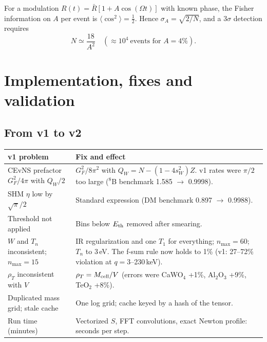 \documentclass[11pt,a4paper]{article}
\numberwithin{equation}{section}
\newcommand{\Eth}{E_{\rm th}}
\newcommand{\avg}[1]{\langle #1\rangle}
\begin{document}
For a modulation $R(t)=\bar R[1+A\cos(\Omega t)]$ with known phase, the Fisher information on
$A$ per event is $\avg{\cos^2}=\frac12$. Hence $\sigma_A=\sqrt{2/N}$, and a $3\sigma$
detection requires
\begin{equation}
  N\simeq\frac{18}{A^2}\quad(\approx10^4\ \text{events for }A=4\%).
\end{equation}

\section{Implementation, fixes and validation}
\label{sec:fixes}\label{sec:validation}
\subsection{From v1 to v2}
\begin{center}\small
\begin{tabularx}{\textwidth}{>{\raggedright}p{4.3cm}X}
\toprule
v1 problem & Fix and effect\\
\midrule
CEvNS prefactor $G_F^2/4\pi$ with $Q_W/2$ & $G_F^2/8\pi^2$ with $Q_W=N-(1-4s_W^2)Z$. v1 rates were $\pi/2$ too large ($^8$B benchmark 1.585 $\to$ 0.9998).\\
SHM $\eta$ low by $\sqrt\pi/2$ & Standard expression (DM benchmark 0.897 $\to$ 0.9988).\\
Threshold not applied & Bins below $\Eth$ removed after smearing.\\
$W$ and $T_n$ inconsistent; $n_{\max}=15$ & IR regularization and one $T_1$ for everything; $n_{\max}=60$; $T_n$ to 3\,eV. The f-sum rule now holds to 1\% (v1: 27--72\% violation at $q=3$--230\,keV).\\
$\rho_T$ inconsistent with $V$ & $\rho_T=M_{\rm cell}/V$ (errors were CaWO$_4$ +1\%, Al$_2$O$_3$ +9\%, TeO$_2$ +8\%).\\
Duplicated mass grid; stale cache & One log grid; cache keyed by a hash of the tensor.\\
Run time (minutes) & Vectorized $S$, FFT convolutions, exact Newton profile: seconds per step.\\
\bottomrule
\end{tabularx}
\end{center}
\end{document}
